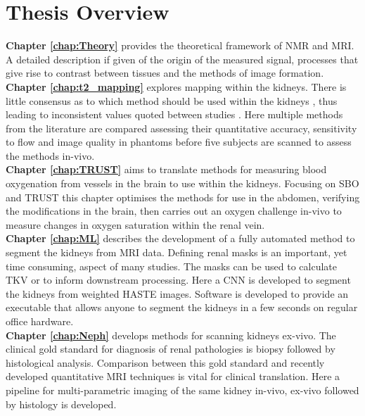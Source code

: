 \section*{Thesis Overview}

\textbf{Chapter \ref{chap:Theory}} provides the theoretical framework of \ac{NMR} and \ac{MRI}. A detailed description if given of the origin of the measured signal, processes that give rise to contrast between tissues and the methods of image formation. \\

\textbf{Chapter \ref{chap:t2_mapping}} explores \ttwo mapping within the kidneys. There is little consensus as to which method should be used within the kidneys \cite{dekkers_consensus-based_2019}, thus leading to inconsistent values quoted between studies \cite{wolf_magnetic_2018}. Here multiple methods from the literature are compared assessing their quantitative accuracy, sensitivity to flow and image quality in phantoms before five subjects are scanned to assess the methods in-vivo.\\

\textbf{Chapter \ref{chap:TRUST}} aims to translate methods for measuring blood oxygenation from vessels in the brain to use within the kidneys. Focusing on \ac{SBO} \cite{jain_mri_2010} and \ac{TRUST} \cite{lu_quantitative_2008} this chapter optimises the methods for use in the abdomen, verifying the modifications in the brain, then carries out an oxygen challenge in-vivo to measure changes in oxygen saturation within the renal vein.\\

\textbf{Chapter \ref{chap:ML}} describes the development of a fully automated method to segment the kidneys from \ac{MRI} data. Defining renal masks is an important, yet time consuming, aspect of many studies. The masks can be used to calculate \ac{TKV} or to inform downstream processing. Here a \ac{CNN} is developed to segment the kidneys from \ttwo weighted \ac{HASTE} images. Software is developed to provide an executable that allows anyone to segment the kidneys in a few seconds on regular office hardware.\\

\textbf{Chapter \ref{chap:Neph}} develops methods for scanning kidneys ex-vivo. The clinical gold standard for diagnosis of renal pathologies is biopsy followed by histological analysis. Comparison between this gold standard and recently developed quantitative \ac{MRI} techniques is vital for clinical translation. Here a pipeline for multi-parametric imaging of the same kidney in-vivo, ex-vivo followed by histology is developed.\\

